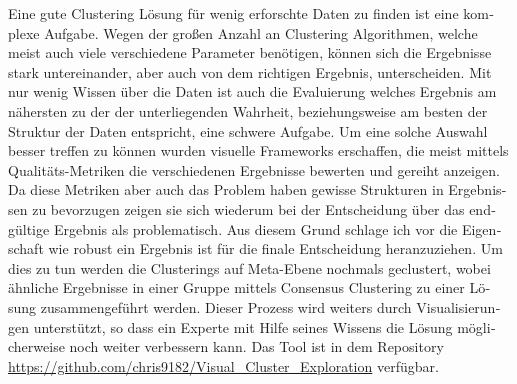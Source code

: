 \iffalse  \fi

\begin{otherlanguage}{ngerman}

Eine gute Clustering Lösung für wenig erforschte Daten zu finden ist eine komplexe Aufgabe. Wegen der großen Anzahl an Clustering Algorithmen, welche meist auch viele verschiedene Parameter benötigen, können sich die Ergebnisse stark untereinander, aber auch von dem richtigen Ergebnis, unterscheiden. Mit nur wenig Wissen über die Daten ist auch die Evaluierung welches Ergebnis am nähersten zu der der unterliegenden Wahrheit, beziehungsweise am besten der Struktur der Daten entspricht, eine schwere Aufgabe.  Um eine solche Auswahl besser treffen zu können wurden visuelle Frameworks erschaffen, die meist mittels Qualitäts-Metriken die verschiedenen Ergebnisse bewerten und gereiht anzeigen. Da diese Metriken aber auch das Problem haben gewisse Strukturen in Ergebnissen zu bevorzugen zeigen sie sich wiederum bei der Entscheidung über das endgültige Ergebnis als problematisch. Aus diesem Grund schlage ich vor die Eigenschaft wie robust ein Ergebnis ist für die finale Entscheidung heranzuziehen. Um dies zu tun werden die Clusterings auf Meta-Ebene nochmals geclustert, wobei ähnliche Ergebnisse in einer Gruppe mittels Consensus Clustering zu einer Lösung zusammengeführt werden. Dieser Prozess wird weiters durch Visualisierungen unterstützt, so dass ein Experte mit Hilfe seines Wissens die Lösung möglicherweise noch weiter verbessern kann. Das Tool ist in dem Repository \url{https://github.com/chris9182/Visual_Cluster_Exploration} verfügbar.

\end{otherlanguage}
